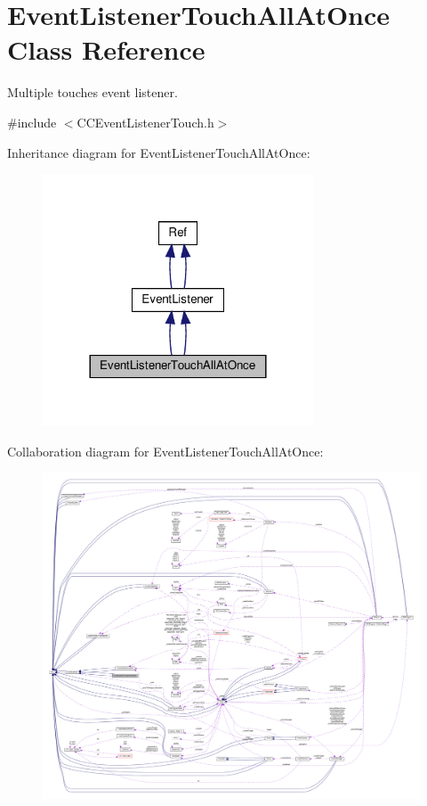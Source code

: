 \hypertarget{classEventListenerTouchAllAtOnce}{}\section{Event\+Listener\+Touch\+All\+At\+Once Class Reference}
\label{classEventListenerTouchAllAtOnce}


Multiple touches event listener.  




{\ttfamily \#include $<$C\+C\+Event\+Listener\+Touch.\+h$>$}



Inheritance diagram for Event\+Listener\+Touch\+All\+At\+Once\+:
\nopagebreak
\begin{figure}[H]
\begin{center}
\leavevmode
\includegraphics[width=228pt]{classEventListenerTouchAllAtOnce__inherit__graph}
\end{center}
\end{figure}


Collaboration diagram for Event\+Listener\+Touch\+All\+At\+Once\+:
\nopagebreak
\begin{figure}[H]
\begin{center}
\leavevmode
\includegraphics[width=350pt]{classEventListenerTouchAllAtOnce__coll__graph}
\end{center}
\end{figure}
